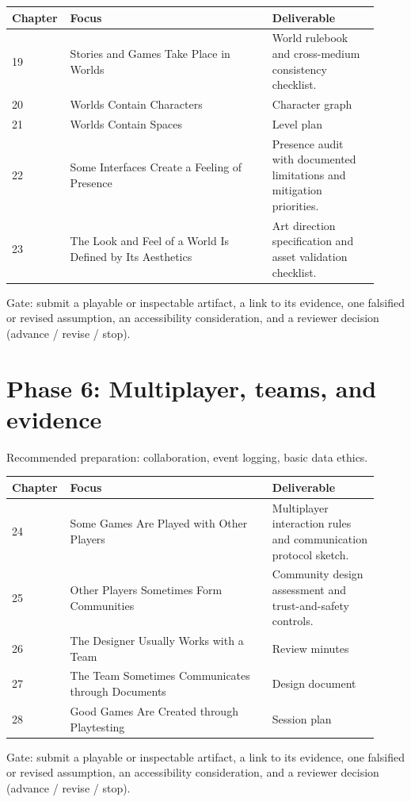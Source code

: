 \documentclass[11pt]{article}
\begin{document}
\begin{longtable}{@{}p{0.11\linewidth}p{0.53\linewidth}p{0.28\linewidth}@{}}\toprule Chapter & Focus & Deliverable \\ \midrule\endhead
19 & Stories and Games Take Place in Worlds & World rulebook and cross-medium consistency checklist. \\
20 & Worlds Contain Characters & Character graph \\
21 & Worlds Contain Spaces & Level plan \\
22 & Some Interfaces Create a Feeling of Presence & Presence audit with documented limitations and mitigation priorities. \\
23 & The Look and Feel of a World Is Defined by Its Aesthetics & Art direction specification and asset validation checklist. \\
\bottomrule\end{longtable}
Gate: submit a playable or inspectable artifact, a link to its evidence, one falsified or revised assumption, an accessibility consideration, and a reviewer decision (advance / revise / stop).


\section{Phase 6: Multiplayer, teams, and evidence}
Recommended preparation: collaboration, event logging, basic data ethics.

\begin{longtable}{@{}p{0.11\linewidth}p{0.53\linewidth}p{0.28\linewidth}@{}}\toprule Chapter & Focus & Deliverable \\ \midrule\endhead
24 & Some Games Are Played with Other Players & Multiplayer interaction rules and communication protocol sketch. \\
25 & Other Players Sometimes Form Communities & Community design assessment and trust-and-safety controls. \\
26 & The Designer Usually Works with a Team & Review minutes \\
27 & The Team Sometimes Communicates through Documents & Design document \\
28 & Good Games Are Created through Playtesting & Session plan \\
\bottomrule\end{longtable}
Gate: submit a playable or inspectable artifact, a link to its evidence, one falsified or revised assumption, an accessibility consideration, and a reviewer decision (advance / revise / stop).
\end{document}
